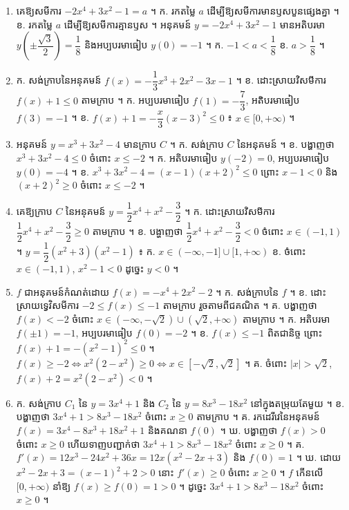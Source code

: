 \begin{enumerate}[1]
  \item គេឱ្យសមីការ $-2x^4 + 3x^2 - 1 = a$ ។ \quad ក. រកតម្លៃ $a$ ដើម្បីឱ្យសមីការមានឫសបួនផ្សេងគ្នា ។ \quad ខ. រកតម្លៃ $a$ ដើម្បីឱ្យសមីការគ្មានឫស ។
  \ans
  អនុគមន៍ $y = -2x^4 + 3x^2 - 1$ មានអតិបរមា $y\left(\pm\dfrac{\sqrt{3}}{2}\right) = \dfrac{1}{8}$ និងអប្បបរមាធៀប $y(0) = -1$ ។ ក. $-1 < a < \dfrac{1}{8}$ \quad ខ. $a > \dfrac{1}{8}$ ។
  \item ក. សង់ក្រាបនៃអនុគមន៍ $f(x) = -\dfrac{1}{3}x^3 + 2x^2 - 3x - 1$ ។ \quad ខ. ដោះស្រាយវិសមីការ $f(x) + 1 \le 0$ តាមក្រាប ។
  \ans
  ក. អប្បបរមាធៀប $f(1) = -\dfrac{7}{3}$, អតិបរមាធៀប $f(3) = -1$ ។ ខ. $f(x) + 1 = -\dfrac{x}{3}(x - 3)^2 \le 0$ ៖ $x \in [0, +\infty)$ ។
  \item អនុគមន៍ $y = x^3 + 3x^2 - 4$ មានក្រាប $C$ ។ \quad ក. សង់ក្រាប $C$ នៃអនុគមន៍ ។ \quad ខ. បង្ហាញថា $x^3 + 3x^2 - 4 \le 0$ ចំពោះ $x \le -2$ ។
  \ans
  ក. អតិបរមាធៀប $y(-2) = 0$, អប្បបរមាធៀប $y(0) = -4$ ។ ខ. $x^3 + 3x^2 - 4 = (x - 1)(x + 2)^2 \le 0$ ព្រោះ $x - 1 < 0$ និង $(x + 2)^2 \ge 0$ ចំពោះ $x \le -2$ ។
  \item គេឱ្យក្រាប $C$ នៃអនុគមន៍ $y = \dfrac{1}{2}x^4 + x^2 - \dfrac{3}{2}$ ។ \quad ក. ដោះស្រាយវិសមីការ $\dfrac{1}{2}x^4 + x^2 - \dfrac{3}{2} \ge 0$ តាមក្រាប ។ \quad ខ. បង្ហាញថា $\dfrac{1}{2}x^4 + x^2 - \dfrac{3}{2} < 0$ ចំពោះ $x \in (-1, 1)$ ។
  \ans
  $y = \dfrac{1}{2}(x^2 + 3)(x^2 - 1)$ ៖ ក. $x \in (-\infty, -1] \cup [1, +\infty)$ \quad ខ. ចំពោះ $x \in (-1, 1)$, $x^2 - 1 < 0$ ដូច្នេះ $y < 0$ ។
  \item $f$ ជាអនុគមន៍កំណត់ដោយ $f(x) = -x^4 + 2x^2 - 2$ ។ \quad ក. សង់ក្រាបនៃ $f$ ។ \quad ខ. ដោះស្រាយទ្វេវិសមីការ $-2 \le f(x) \le -1$ តាមក្រាប រួចតាមពីជគណិត ។ \quad គ. បង្ហាញថា $f(x) < -2$ ចំពោះ $x \in (-\infty, -\sqrt{2}) \cup (\sqrt{2}, +\infty)$ តាមក្រាប ។
  \ans
  ក. អតិបរមា $f(\pm 1) = -1$, អប្បបរមាធៀប $f(0) = -2$ ។ ខ. $f(x) \le -1$ ពិតជានិច្ច ព្រោះ $f(x) + 1 = -(x^2 - 1)^2 \le 0$ ។ $f(x) \ge -2 \Leftrightarrow x^2(2 - x^2) \ge 0 \Leftrightarrow x \in [-\sqrt{2}, \sqrt{2}]$ ។ គ. ចំពោះ $|x| > \sqrt{2}$, $f(x) + 2 = x^2(2 - x^2) < 0$ ។
  \item ក. សង់ក្រាប $C_1$ នៃ $y = 3x^4 + 1$ និង $C_2$ នៃ $y = 8x^3 - 18x^2$ នៅក្នុងតម្រុយតែមួយ ។ \quad ខ. បង្ហាញថា $3x^4 + 1 > 8x^3 - 18x^2$ ចំពោះ $x \ge 0$ តាមក្រាប ។ \quad គ. រកដេរីវេនៃអនុគមន៍ $f(x) = 3x^4 - 8x^3 + 18x^2 + 1$ និងគណនា $f(0)$ ។ \quad ឃ. បង្ហាញថា $f(x) > 0$ ចំពោះ $x \ge 0$ ហើយទាញបញ្ជាក់ថា $3x^4 + 1 > 8x^3 - 18x^2$ ចំពោះ $x \ge 0$ ។
  \ans
  គ. $f'(x) = 12x^3 - 24x^2 + 36x = 12x(x^2 - 2x + 3)$ និង $f(0) = 1$ ។ ឃ. ដោយ $x^2 - 2x + 3 = (x - 1)^2 + 2 > 0$ នោះ $f'(x) \ge 0$ ចំពោះ $x \ge 0$ ។ $f$ កើនលើ $[0, +\infty)$ នាំឱ្យ $f(x) \ge f(0) = 1 > 0$ ។ ដូច្នេះ $3x^4 + 1 > 8x^3 - 18x^2$ ចំពោះ $x \ge 0$ ។
\end{enumerate}
